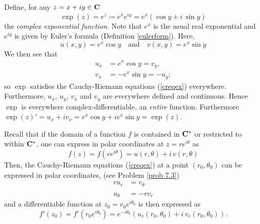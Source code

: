 \medskip

\begin{example}\label{expcmplxeg}
Define, for any $z = x + iy \in \mathbf C$
\[\exp(z) = e^z \coloneqq e^xe^{iy} = e^x(\cos y + i\,\sin y)\]
the \emph{complex exponential function}. Note that $e^x$ is the usual real exponential and $e^{iy}$ is given by Euler's formula (Definition \ref{eulerform}). Here, 
\[u(x,y) = e^x\cos y \quad \text{and} \quad v(x,y) = e^x\sin y\]
We then see that
\begin{align*}
u_x &= e^x\cos y = v_y,\\[0.5em] v_x &= -e^x\sin y = -u_y;
\end{align*}
so $\exp$ satisfies the Cauchy-Riemann equations (\ref{creqex}) everywhere. Furthermore, $u_x,\,u_y,\,v_x$ and $v_y$ are everywhere defined and continuous. Hence $\exp$ is everywhere complex-differentiable, an \emph{entire} function. Furthermore $\exp(z)' = u_x + iv_x = e^x\cos y + ie^x\sin y = \exp(z)$.
\end{example}

\medskip

\begin{discussion}
Recall that if the domain of a function $f$ is contained in $\mathbf C^*$ or restricted to within $\mathbf C^*$, one can express in polar coordinates at $z = re^{i\theta}$ as
\[f(z) = f(re^{i\theta}) = u(r,\theta) + i\,v(r,\theta)\]
Then, the Cauchy-Riemann equations (\ref{creqex}) at a point $(r_0,\theta_0)$ can be expressed in polar coordinates,  (see Problem \ref{prob 7.3})
\begin{align*}\label{pcreqex}
ru_r &= v_\theta\\[-0.5em]
\tag{Polar CR}\\[-0.5em]
u_\theta &= -rv_r
\end{align*}
and a differentiable function at $z_0 = r_0e^{i\theta_0}$ is then expressed as \[f'(z_0) = f'(r_0e^{i\theta_0}) = e^{-i\theta_0}(u_r(r_0,\theta_0) + i\,v_r(r_0,\theta_0)).\]
\end{discussion}

\medskip

